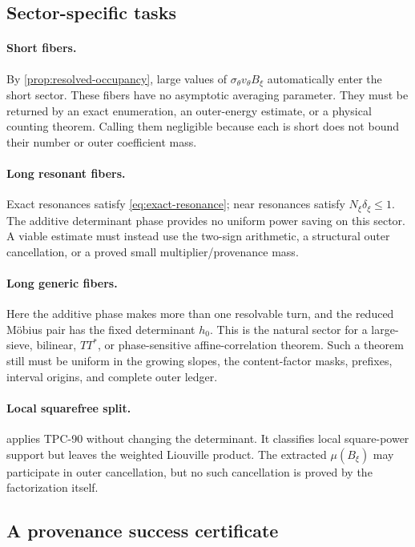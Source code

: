 \subsection{Sector-specific tasks}

\paragraph{Short fibers.}
By \cref{prop:resolved-occupancy}, large values of
\(\sigma_\theta v_\theta B_\xi\) automatically enter the short
sector.  These fibers have no asymptotic averaging parameter.  They
must be returned by an exact enumeration, an outer-energy estimate,
or a physical counting theorem.  Calling them negligible because
each is short does not bound their number or outer coefficient mass.

\paragraph{Long resonant fibers.}
Exact resonances satisfy
\eqref{eq:exact-resonance}; near resonances satisfy
\(N_\xi\delta_\xi\le1\).  The additive determinant phase provides no
uniform power saving on this sector.  A viable estimate must instead
use the two-sign arithmetic, a structural outer cancellation, or a
proved small multiplier/provenance mass.

\paragraph{Long generic fibers.}
Here the additive phase makes more than one resolvable turn, and the
reduced M\"obius pair has the fixed determinant \(h_0\).  This is the
natural sector for a large-sieve, bilinear, \(TT^\ast\), or
phase-sensitive affine-correlation theorem.  Such a theorem still
must be uniform in the growing slopes, the content-factor masks,
prefixes, interval origins, and complete outer ledger.

\paragraph{Local squarefree split.}
 applies TPC-90 without changing the
determinant.  It classifies local square-power support but leaves the
weighted Liouville product.  The extracted \(\mu(B_\xi)\) may
participate in outer cancellation, but no such cancellation is
proved by the factorization itself.

\subsection{A provenance success certificate}

